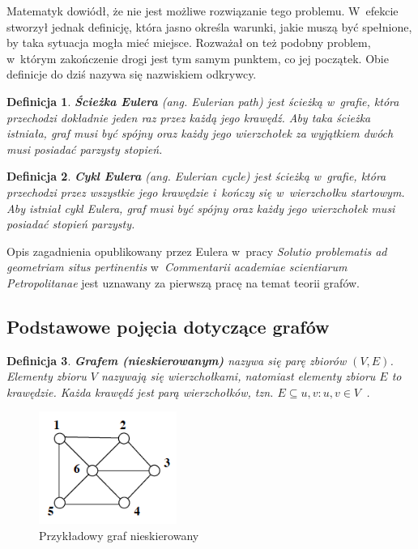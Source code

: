 \documentclass[twoside,12pt]{report}
\newtheorem{definition}{Definicja} %
\begin{document}
Matematyk dowiódł, że nie jest możliwe rozwiązanie tego problemu. W~efekcie stworzył jednak definicję, która jasno określa warunki, jakie muszą być spełnione, by taka sytuacja mogła mieć miejsce. Rozważał on też podobny problem, w~którym zakończenie drogi jest tym samym punktem, co jej początek. Obie definicje do dziś nazywa się nazwiskiem odkrywcy.

\begin{definition}
\textbf{Ścieżka Eulera} \textit{(ang. Eulerian path)} jest ścieżką w~grafie, która przechodzi dokładnie jeden raz przez każdą jego krawędź. Aby taka ścieżka istniała, graf musi być spójny oraz każdy jego wierzchołek za wyjątkiem dwóch musi posiadać parzysty stopień.
\end{definition}

\begin{definition}
\textbf{Cykl Eulera} \textit{(ang. Eulerian cycle)} jest ścieżką w~grafie, która przechodzi przez wszystkie jego krawędzie i~kończy się w~wierzchołku startowym. Aby istniał cykl Eulera, graf musi być spójny oraz każdy jego wierzchołek musi posiadać stopień parzysty.
\end{definition}

Opis zagadnienia opublikowany przez Eulera w~pracy \textit{Solutio problematis ad geometriam situs pertinentis} w~\textit{Commentarii academiae scientiarum Petropolitanae} jest uznawany za pierwszą pracę na temat teorii grafów.

\subsection{Podstawowe pojęcia dotyczące grafów}\label{sec:podstawy_grafy}

\begin{definition}\label{def:graf_nieskierowany}
\textbf{Grafem (nieskierowanym)} nazywa się parę zbiorów $(V,E)$. Elementy zbioru $V$ nazywają się \textit{wierzchołkami}, natomiast elementy zbioru $E$ to \textit{krawędzie}. Każda krawędź jest parą wierzchołków, tzn. $E \subseteq {{u,v}:u,v \in V}$~\cite{grafy}.
\end{definition}

\begin{figure}[htbp]
	\centering
	\includegraphics[width=0.40\textwidth]{img/graf1}
	\caption{Przykładowy graf nieskierowany} 
	\label{fig:graf_nieskierowany}
\end{figure}
\end{document}
